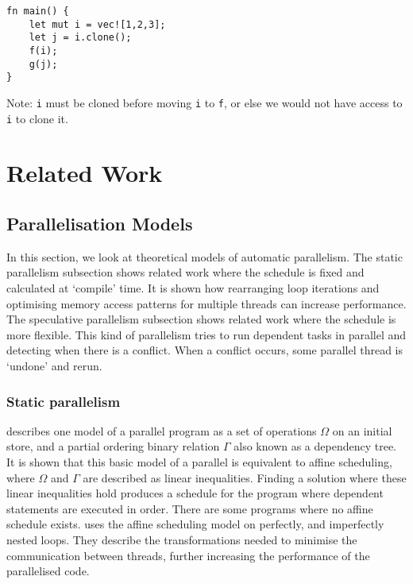 \documentclass[conference]{IEEEtran}
\begin{document}
\begin{verbatim}
fn main() {
    let mut i = vec![1,2,3];
    let j = i.clone();
    f(i);
    g(j);
}
\end{verbatim}

Note: \texttt{i} must be cloned before moving \texttt{i} to \texttt{f}, or else we would not have access to \texttt{i} to clone it.

\section{Related Work}
\label{sec:related-work}

\subsection{Parallelisation Models}
\label{sec:related-models}
In this section, we look at theoretical models of automatic parallelism. The static parallelism subsection shows related work where the schedule is fixed and calculated at `compile' time. It is shown how rearranging loop iterations and optimising memory access patterns for multiple threads can increase performance. The speculative parallelism subsection shows related work where the schedule is more flexible. This kind of parallelism tries to run dependent tasks in parallel and detecting when there is a conflict. When a conflict occurs, some parallel thread is `undone' and rerun.

\subsubsection{Static parallelism}
\textcite{Feautrier1992} describes one model of a parallel program as a set of operations $\Omega$ on an initial store, and a partial ordering binary relation $\Gamma$ also known as a dependency tree. It is shown that this basic model of a parallel is equivalent to affine scheduling, where $\Omega$ and $\Gamma$ are described as linear inequalities. Finding a solution where these linear inequalities hold produces a schedule for the program where dependent statements are executed in order. There are some programs where no affine schedule exists.
\textcite{Bondhugula2008} uses the affine scheduling model on perfectly, and imperfectly nested loops. They describe the transformations needed to minimise the communication between threads, further increasing the performance of the parallelised code.
\end{document}
